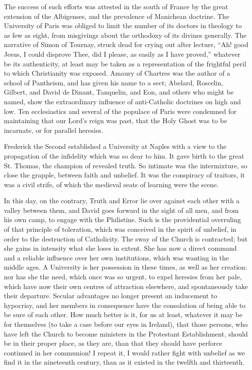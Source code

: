 The success of such efforts was attested in the south of France by
the great extension of the Albigenses, and the prevalence of Manichean
doctrine. The University of Paris was obliged to limit the number of
its doctors in theology to as few as eight, from misgivings about the
orthodoxy of its divines generally. The narrative of Simon of Tournay,
struck dead for crying out after lecture, ``Ah! good Jesus, I
could disprove Thee, did I please, as easily as I have proved,''
whatever be its authenticity, at least may be taken as a
representation of the frightful peril to which Christianity was
exposed. Amaury of Chartres was the author of a school of Pantheism,
and has given his name to a sect; Abelard, Roscelin, Gilbert, and
David de Dinant, Tanquelin, and Eon, and others who might be named,
show the extraordinary influence of anti-Catholic doctrines on high
and low. Ten ecclesiastics and several of the populace of Paris were
condemned for maintaining that our Lord's reign was past, that the
Holy Ghost was to be incarnate, or for parallel heresies.

Frederick the Second established a University at Naples with a view
to the propagation of the infidelity which was so dear to him. It gave
birth to the great St. Thomas, the champion of revealed truth. So
intimate was the intermixture, so close the grapple, between faith and
unbelief. It was the conspiracy of traitors, it was a civil strife, of
which the medieval seats of learning were the scene.

In this day, on the contrary, Truth and Error lie over against each
other with a valley between them, and David goes forward in the
sight of all men, and from his own camp, to engage with the
Philistine. Such is the providential overruling of that principle of
toleration, which was conceived in the spirit of unbelief, in order to
the destruction of Catholicity. The sway of the Church is contracted;
but she gains in intensity what she loses in extent. She has now a
direct command and a reliable influence over her own institutions,
which was wanting in the middle ages. A University is her possession
in these times, as well as her creation: nor has she the need, which
once was so urgent, to expel heresies from her pale, which have now
their own centres of attraction elsewhere, and spontaneously take
their departure. Secular advantages no longer present an inducement to
hypocrisy, and her members in consequence have the consolation of
being able to be sure of each other. How much better is it, for us at
least, whatever it may be for themselves (to take a case before our
eyes in Ireland), that those persons, who have left the Church to
become ministers in the Protestant Establishment, should be in their
proper place, as they are, than that they should have perforce
continued in her communion! I repeat it, I would rather fight with
unbelief as we find it in the nineteenth century, than as it existed
in the twelfth and thirteenth.

